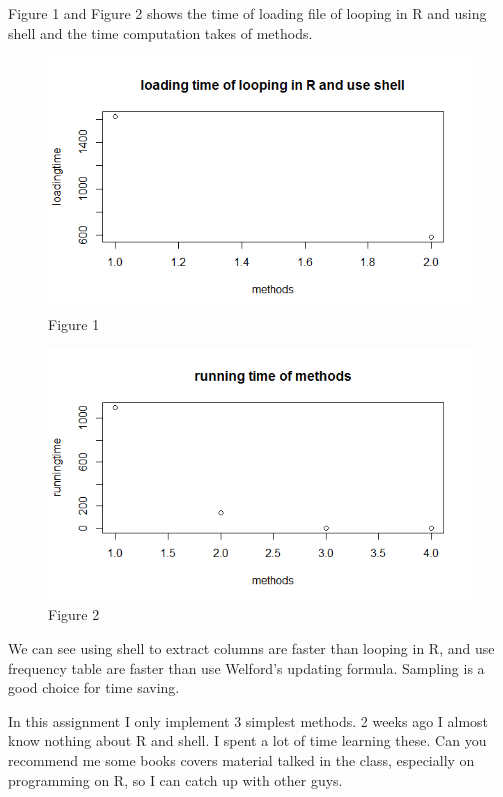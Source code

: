 \documentclass[12pt,a4paper]{article}
\begin{document}
Figure 1 and Figure 2 shows the time of loading file of looping in R and using shell and the time computation takes of methods.
\begin{figure}[!htbp]
\centering
\includegraphics[width=14.5cm]{Rplot.png}
\caption{Figure 1}
\end{figure}
\begin{figure}[!htbp]
\centering
\includegraphics[width=14.5cm]{Rplot1.png}
\caption{Figure 2}
\end{figure}
We can see using shell to extract columns are faster than looping in R, and use frequency table are faster than use  Welford's updating formula. Sampling is a good choice for time saving.

In this assignment I only implement 3 simplest methods. 2 weeks ago I almost know nothing about R and shell. I spent a lot of time learning these. Can you recommend me some books covers material talked in the class, especially on programming on R, so I can catch up with other guys.   
\end{document}
